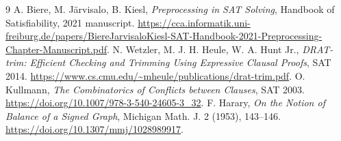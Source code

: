\documentclass[10pt]{article}
\begin{document}
\begin{thebibliography}{9}
 A. Biere, M. J\"arvisalo, B. Kiesl, \emph{Preprocessing in SAT Solving}, Handbook of Satisfiability, 2021 manuscript. \url{https://cca.informatik.uni-freiburg.de/papers/BiereJarvisaloKiesl-SAT-Handbook-2021-Preprocessing-Chapter-Manuscript.pdf}.
 N. Wetzler, M. J. H. Heule, W. A. Hunt Jr., \emph{DRAT-trim: Efficient Checking and Trimming Using Expressive Clausal Proofs}, SAT 2014. \url{https://www.cs.cmu.edu/~mheule/publications/drat-trim.pdf}.
 O. Kullmann, \emph{The Combinatorics of Conflicts between Clauses}, SAT 2003. \url{https://doi.org/10.1007/978-3-540-24605-3_32}.
 F. Harary, \emph{On the Notion of Balance of a Signed Graph}, Michigan Math. J. 2 (1953), 143--146. \url{https://doi.org/10.1307/mmj/1028989917}.
\end{thebibliography}
\end{document}
